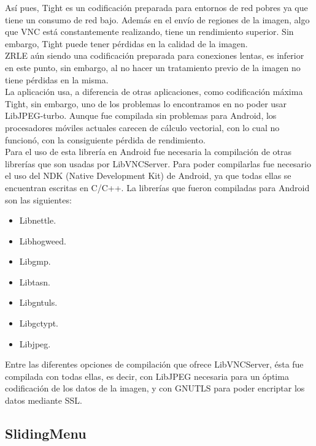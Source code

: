 Así pues, Tight es un codificación preparada para entornos de red pobres ya que tiene un consumo de red bajo. Además en el envío de regiones de la imagen, algo que VNC está constantemente realizando, tiene un rendimiento superior. Sin embargo, Tight puede tener pérdidas en la calidad de la imagen.\\

ZRLE aún siendo una codificación preparada para conexiones lentas, es inferior en este punto, sin embargo, al no hacer un tratamiento previo de la imagen no tiene pérdidas en la misma.\\

La aplicación usa, a diferencia de otras aplicaciones, como codificación máxima Tight, sin embargo, uno de los problemas lo encontramos en no poder usar LibJPEG-turbo. Aunque fue compilada sin problemas para Android, los procesadores móviles actuales carecen de cálculo vectorial, con lo cual no funcionó, con la consiguiente pérdida de rendimiento.\\

Para el uso de esta librería en Android fue necesaria la compilación de otras librerías que son usadas por LibVNCServer. Para poder compilarlas fue necesario el uso del NDK (Native Development Kit) de Android, ya que todas ellas se encuentran escritas en C/C++. La librerías que fueron compiladas para Android son las siguientes:
\begin{itemize}
\item Libnettle.
\item Libhogweed.
\item Libgmp.
\item Libtasn.
\item Libgntuls.
\item Libgctypt.
\item Libjpeg.
\end{itemize}

Entre las diferentes opciones de compilación que ofrece LibVNCServer, ésta fue compilada con todas ellas, es decir, con LibJPEG necesaria para un óptima codificación de los datos de la imagen, y con GNUTLS para poder encriptar los datos mediante SSL.

\subsection{SlidingMenu}

